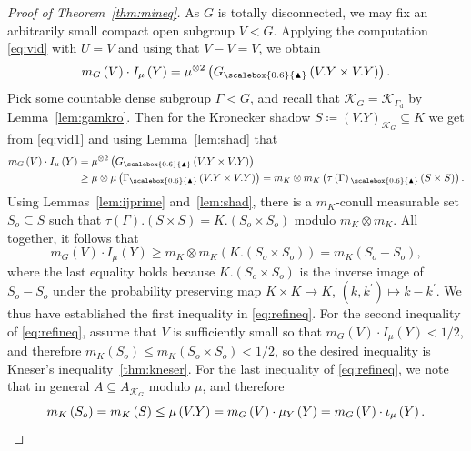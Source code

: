 \documentclass{amsart}
\numberwithin{equation}{subsection}
\theoremstyle{remark}
\newcommand{\diag}{\textsubscript{\raisebox{0.4ex}{\scalebox{0.6}{\(\blacktriangle\)}}}}\xspace
\begin{document}
\begin{proof}[Proof of Theorem~\ref{thm:mineq}]
As \(G\) is totally disconnected, we may fix an arbitrarily small compact open subgroup \(V<G\). Applying the computation \eqref{eq:vid} with \(U=V\) and using that \(V-V=V\), we obtain
\begin{equation}\label{eq:vid1}
m_{G}\left(V\right)\cdot I_{\mu}\left(Y\right)=\mu^{\otimes2}\left(G\diag\left(V.Y\times V.Y\right)\right).
\end{equation}
Pick some countable dense subgroup \(\Gamma<G\), and recall that \(\mathcal{K}_{G}=\mathcal{K}_{\Gamma_{\mathrm{d}}}\) by Lemma~\ref{lem:gamkro}. Then for the Kronecker shadow \(S\coloneqq \left(V.Y\right)_{\mathcal{K}_{G}}\subseteq K\) we get from \eqref{eq:vid1} and using Lemma~\ref{lem:shad} that
\begin{align*}
m_{G}\left(V\right)\cdot I_{\mu}\left(Y\right)
&=\mu^{\otimes2}\left(G\diag\left(V.Y\times V.Y\right)\right)\\
&\geq\mu\otimes\mu\left(\Gamma\diag\left(V.Y\times V.Y\right)\right)=m_{K}\otimes m_{K}\left(\tau\left(\Gamma\right)\diag\left(S\times S\right)\right).
\end{align*}
Using Lemmas~\ref{lem:ijprime} and~\ref{lem:shad}, there is a \(m_{K}\)-conull measurable set \(S_{o}\subseteq S\) such that \(\tau\left(\Gamma\right).\left(S\times S\right)=K.\left(S_{o}\times S_{o}\right)\) modulo \(m_{K}\otimes m_{K}\). All together, it follows that
\[m_{G}\left(V\right)\cdot I_{\mu}\left(Y\right)\geq m_{K}\otimes m_{K}\left(K.\left(S_{o}\times S_{o}\right)\right)=m_{K}\left(S_{o}-S_{o}\right),\]
where the last equality holds because \(K.\left(S_{o}\times S_{o}\right)\) is the inverse image of \(S_{o}-S_{o}\) under the probability preserving map \(K\times K\to K\), \(\left(k,k^{\prime}\right)\mapsto k-k^{\prime}\). We thus have established the first inequality in \eqref{eq:refineq}. For the second inequality of \eqref{eq:refineq}, assume that \(V\) is sufficiently small so that \(m_{G}\left(V\right)\cdot I_{\mu}\left(Y\right)<1/2\), and therefore \(m_{K}\left(S_{o}\right)\leq m_{K}\left(S_{o}\times S_{o}\right)<1/2\), so the desired inequality is Kneser's inequality~\ref{thm:kneser}. For the last inequality of \eqref{eq:refineq}, we note that in general \(A\subseteq A_{\mathcal{K}_{G}}\) modulo \(\mu\), and therefore
\[m_{K}\left(S_{o}\right)=m_{K}\left(S\right)\leq\mu\left(V.Y\right)=m_{G}\left(V\right)\cdot\mu_{Y}\left(Y\right)=m_{G}\left(V\right)\cdot\iota_{\mu}\left(Y\right).\qedhere\]
\end{proof}
\end{document}
